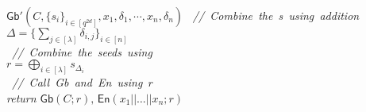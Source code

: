 \documentclass{article}
\newcommand{\comment}[1]{\sl\small\color{black!50} \mbox{ // #1 }}
\begin{document}
\begin{codebox}{$\mathsf{Gb}'(C, \{s_i\}_{i \in [q^{2d}]}, x_1, \delta_1, \cdots, x_n, \delta_n)$}
    \comment{Combine the \delta{}s using addition}\\
    $\Delta = \{ \sum_{j \in [\lambda]}  \delta_{i,j} \}_{i \in [n]}$\\
    \comment{Combine the seeds using \Delta}\\
    $r = \bigoplus_{i \in [\lambda]} s_{\Delta_i}$\\
    \comment{Call \textsf{Gb} and \textsf{En} using $r$}\\
    return $\textsf{Gb}(C; r),\, \textsf{En}(x_1 || \dots || x_n; r)$
\end{codebox}
\end{document}
